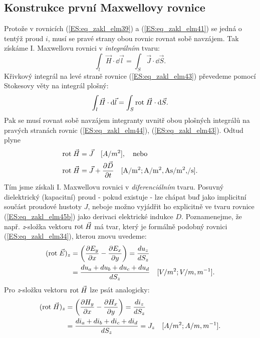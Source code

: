     \subsection{Konstrukce první Maxwellovy rovnice}
      Protože v rovnicích (\ref{ES:eq_zakl_elm39}) a (\ref{ES:eq_zakl_elm41}) se jedná o tentýž 
      proud \(i\), musí se pravé strany obou rovnic rovnat sobě navzájem. Tak získáme I. 
      Maxwellovu rovnici v \emph{integrálním} tvaru:
      \begin{equation}\label{ES:eq_zakl_elm43}
        \int_l \vec{H}\cdot \dd{\vec{l}} = \int_S \vec{J}\cdot \dd{\vec{S}}.
      \end{equation} 
      Křivkový integrál na levé straně rovnice (\ref{ES:eq_zakl_elm43}) převedeme pomocí Stokesovy 
      věty na integrál plošný:	
      \begin{equation}\label{ES:eq_zakl_elm44}
        \int_l \vec{H}\cdot \mathop{}\!\mathrm{d}\vec{l} = \int_S \mathrm{rot}\;\vec{H}\cdot \mathop{}\!\mathrm{d}\vec{S}.
      \end{equation} 
      Pak se musí rovnat sobě navzájem integranty uvnitř obou plošných integrálů na pravých 
      stranách rovnic (\ref{ES:eq_zakl_elm44}), (\ref{ES:eq_zakl_elm43}). Odtud plyne
      \begin{subequations}
        \begin{align}
          \rot{H} &= \vec{J} \quad [A/m^2], \quad\text{nebo}      \label{ES:eq_zakl_elm45a} \\
          \rot{H} &= \vec{J} + \pder{\vec{D}}{t} 
                     \quad %
                     [\si[per-mode=fraction]{\A\per\square\m; \A\per\square\m, \A\s\per\square\m, \per\s}].  \label{ES:eq_zakl_elm45b}
        \end{align}
      \end{subequations}
      Tím jsme získali I. Maxwellovu rovnici v \emph{diferenciálním} tvaru. Posuvný dielektrický 
      (kapacitní) proud - pokud existuje - lze chápat buď jako implicitní součást proudové hustoty 
      \(J\), neboje možno vyjádřit ho explicitně ve tvaru rovnice (\ref{ES:eq_zakl_elm45b}) 
      jako derivaci elektrické indukce \(D\). Poznamenejme, že např. \emph{z}-složka vektoru 
      \(\mathrm{rot}\;\vec{H}\) má tvar, který je formálně podobný rovnici (\ref{ES:eq_zakl_elm34}), kterou 
      znovu uvedeme:
      \begin{align*}
         (\mathrm{rot}\;\vec{E})_z &= \left(\dfrac{\partial E_y}{\partial x} - \dfrac{\partial E_x}{\partial y}\right)
                      = \frac{du_z}{dS_z}                                                  \\
                     &= \frac{du_a + du_b + du_c + du_d}{dS_z} \quad[V/m^2; V/m, m^{-1}].
      \end{align*}
      Pro \emph{z}-složku vektoru \(\mathrm{rot}\;\vec{H}\) lze psát analogicky:
      \begin{align*}
        (\mathrm{rot}\;\vec{H})_z &= \left(\dfrac{\partial H_y}{\partial x} - \dfrac{\partial H_x}{\partial y}\right)
                     = \frac{di_z}{dS_z}                                                   \\
                    &= \frac{di_a + di_b + di_c + di_d}{dS_z} = J_z \quad[A/m^2; A/m, m^{-1}].
      \end{align*}
      
